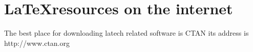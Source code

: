 \documentclass{article}
\begin{document}
\section{\sffamily\LaTeX resources on the internet}
The best place for downloading latech related software is CTAN
its address is \ttfamily http://www.ctan.org\rmfamily
\end{document}
